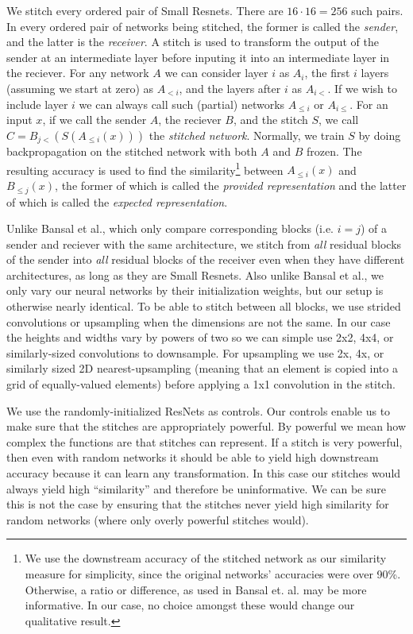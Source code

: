 \documentclass{article}
\begin{document}
We stitch every ordered pair of Small Resnets. There are $16 \cdot 16 = 256$ such pairs.
In every ordered pair of networks being stitched, the former is called the \textit{sender}, and the latter
is the \textit{receiver}. A stitch is used to transform the output of the sender at an intermediate layer
before inputing it into an intermediate layer in the reciever. For any network $A$ we can consider 
layer $i$ as $A_i$, the first $i$  layers (assuming we start at zero) as $A_{<i}$, and the layers 
after $i$ as $A_{i<}$. If we wish to include layer $i$ we can always call such (partial) networks
$A_{\leq i}$ or $A_{i\leq}$. For an input $x$, if we call the sender $A$, the reciever $B$,
and the stitch $S$, we call $C = B_{j<}(S(A_{\leq i}(x)))$ the \textit{stitched network}. Normally,
we train $S$ by doing backpropagation on the stitched network with both $A$ and $B$ frozen. The
resulting accuracy is used to find the similarity\footnote{
  We use the downstream accuracy of the stitched network as our similarity measure for simplicity,
  since the original networks' accuracies were over 90\%. Otherwise, a ratio or difference, as used
  in Bansal et. al. may be more informative. In our case, no choice amongst these would change
  our qualitative result.
} between $A_{\leq i}(x)$ and $B_{\leq j}(x)$, the
former of which is called the \textit{provided representation} and the latter of which is called
the \textit{expected representation}.

Unlike Bansal et al., which only compare corresponding blocks (i.e. $i = j$) of a sender and
reciever with the same architecture,
we stitch from \textit{all} residual blocks of the sender into
\textit{all} residual blocks of the receiver even when they have different architectures, as long as
they are Small Resnets. Also unlike Bansal et al., we only vary
our neural networks by their initialization weights, but our setup is otherwise nearly identical. To
be able to stitch between all blocks, we use strided convolutions or upsampling when the dimensions
are not the same.
In our case the heights and widths vary by powers of two so we can simple use 2x2, 4x4,
or similarly-sized convolutions to downsample. For upsampling we use 2x, 4x, or similarly
sized 2D nearest-upsampling (meaning that an element is copied into a grid of equally-valued elements)
before applying a 1x1 convolution in the stitch.

We use the randomly-initialized ResNets as controls. Our controls enable us to make sure that
the stitches are appropriately powerful. By powerful we mean how complex the functions are that
stitches can represent. If a stitch is very powerful, then even with random networks it should be able to
yield high downstream accuracy because it can learn any transformation. In this case our 
stitches would always yield high ``similarity'' and therefore be uninformative.
We can be sure this is not the case by ensuring that
the stitches never yield high similarity for random networks (where only overly powerful stitches
would).
\end{document}
